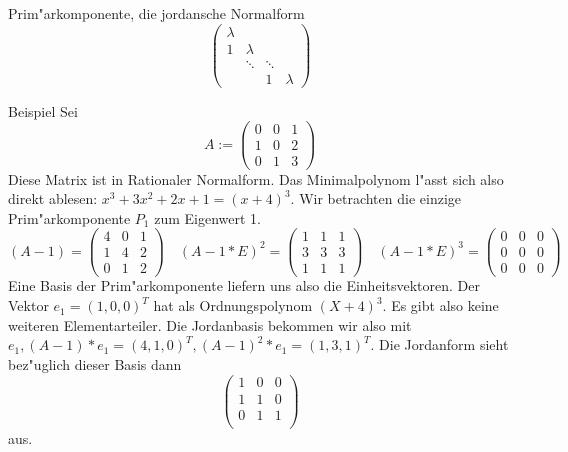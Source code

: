 \documentclass[a4paper]{article}
\begin{document}
\begin{section}{Prim"arkomponente, die jordansche Normalform}
$$\left ( \begin{array}{cccc}
\lambda &         &        & \\
1       & \lambda &        & \\
        & \ddots  & \ddots & \\
        &         & 1      & \lambda
\end{array} \right )$$
\begin{subsection}{Beispiel}
\label{bsp-1}
Sei  $$A := \left ( \begin{array}{ccc}
0 & 0 & 1 \\
1 & 0 & 2 \\
0 & 1 & 3 
\end{array} \right )$$
Diese Matrix ist in Rationaler Normalform. Das Minimalpolynom l"asst sich also direkt ablesen: $x^3 + 3 x^2 + 2 x +1 = (x + 4)^3$. Wir betrachten die einzige Prim"arkomponente $P_1$ zum Eigenwert 1.
$$(A-1)=\left ( \begin{array}{ccc}
4 & 0 & 1\\
1 & 4 & 2\\
0 & 1 & 2
\end{array} \right )
\quad (A-1*E)^2=\left ( \begin{array}{ccc}
1 & 1 & 1\\
3 & 3 & 3\\
1 & 1 & 1
\end{array} \right )
\quad (A-1*E)^3=\left ( \begin{array}{ccc}
0 & 0 & 0\\
0 & 0 & 0\\
0 & 0 & 0
\end{array}\right )
$$
Eine Basis der Prim"arkomponente liefern uns also die Einheitsvektoren. Der Vektor $e_1 = (1,0,0)^T$ hat als Ordnungspolynom $(X+4)^3$. Es gibt also keine weiteren Elementarteiler. Die Jordanbasis bekommen wir also mit $e_1, (A-1) * e_1 = (4, 1, 0)^T, (A-1)^2 * e_1 = (1, 3, 1)^T$. Die Jordanform sieht bez"uglich dieser Basis dann
$$\left (\begin{array}{ccc}
1 & 0 & 0\\
1 & 1 & 0\\
0 & 1 & 1\\
\end{array} \right )$$
aus.
\end{subsection}
\end{section}
\end{document}
